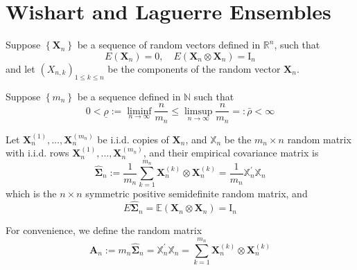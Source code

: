 \chapter{Wishart and Laguerre Ensembles}

Suppose $\left\{\mathbf{X}_{n}\right\}$ be a sequence of random vectors defined in $\mathbb{R}^{n}$, such that
\begin{equation*}
    E\left(\mathbf{X}_{n}\right)=0,\quad E\left(\mathbf{X}_{n} \otimes \mathbf{X}_{n}\right)=\mathrm{I}_{n}
\end{equation*}
and let $\left(X_{n,k}\right)_{1\leq k\leq n}$ be the components of the random vector $\mathbf{X}_{n}$.

Suppose $\left\{m_{n}\right\}$ be a sequence defined in $\mathbb{N}$ such that
\begin{equation*}
    0<\underline{\rho}:=\liminf_{n\rightarrow\infty}\frac{n}{m_{n}}\leq\limsup_{n\rightarrow\infty}\frac{n}{m_{n}}=:\bar{\rho}<\infty
\end{equation*}

Let $\mathbf{X}_{n}^{(1)},\ldots,\mathbf{X}_{n}^{\left(m_{n}\right)}$ be i.i.d. copies of $\mathbf{X}_{n}$, and $\mathbb{X}_{n}$ be the $m_{n}\times n$ random matrix with i.i.d. rows $\mathbf{X}_{n}^{(1)},\ldots,\mathbf{X}_{n}^{\left(m_{n}\right)}$, and their empirical covariance matrix is
\begin{equation*}
    \widehat{\boldsymbol{\Sigma}}_{n}:=\frac{1}{m_{n}}\sum_{k=1}^{m_{n}}\mathbf{X}_{n}^{(k)}\otimes \mathbf{X}_{n}^{(k)}=\frac{1}{m_{n}}\mathbb{X}_{n}^{\prime}\mathbb{X}_{n}
\end{equation*}
which is the $n\times n$ symmetric positive semidefinite random matrix, and
\begin{equation*}
    E\widehat{\boldsymbol{\Sigma}}_{n}=\mathbb{E}\left(\mathbf{X}_{n}\otimes\mathbf{X}_{n}\right)=\mathrm{I}_{n}
\end{equation*}

For convenience, we define the random matrix
\begin{equation*}
    \mathbf{A}_{n}:=m_{n}\widehat{\boldsymbol{\Sigma}}_{n}=\mathbb{X}_{n}^{\prime}\mathbb{X}_{n}=\sum_{k=1}^{m_{n}}\mathbf{X}_{n}^{(k)}\otimes\mathbf{X}_{n}^{(k)}
\end{equation*}

